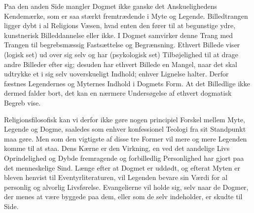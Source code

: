 \documentclass[12pt,a4paper,openany]{book}
\begin{document}
Paa den anden Side mangler Dogmet ikke ganske det Anskuelighedens
Kendemærke, som er saa stærkt fremtrædende i Myte og Legende.
Billedtrangen ligger dybt i al Religions Væsen, hvad enten den fører til
at begunstige ydre, kunstnerisk Billeddannelse eller ikke. I Dogmet
samvirker denne Trang med Trangen til begrebsmæssig Fastsættelse og
Begrænsning. Ethvert Billede viser (logisk set) ud over sig selv og har
(psykologisk set) Tilbøjelighed til at drage andre Billeder efter sig;
desuden har ethvert Billede en Mangel, naar det skal udtrykke et i sig
selv uoverskueligt Indhold; enhver Lignelse halter. Derfor fæstnes
Legendernes og Myternes Indhold i Dogmets Form. At det Billedlige ikke
dermed falder bort, det kan en nærmere Undersøgelse af ethvert dogmatisk
Begreb vise.

Religionsfilosofisk kan vi derfor ikke gøre nogen principiel Forskel
mellem Myte, Legende og Dogme, saaledes som enhver konfessionel Teologi
fra sit Standpunkt maa gøre. Men som den vigtigste af disse tre Former
vil mere og mere Legenden komme til at staa. Dens Kærne er den Virkning,
en ved det aandelige Livs Oprindelighed og Dybde fremragende og
forbilledlig Personlighed har gjort paa det menneskelige Sind. Længe
efter at Dogmet er uddødt, og efterat Myten er bleven henvist til
Eventyrliteraturen, vil Legenden bevare sin Værdi for al personlig og
alvorlig Livsførelse. Evangelierne vil holde sig, selv naar de Dogmer,
der menes at være byggede paa dem, eller som de selv indeholder, er
skudte til Side.
\end{document}
